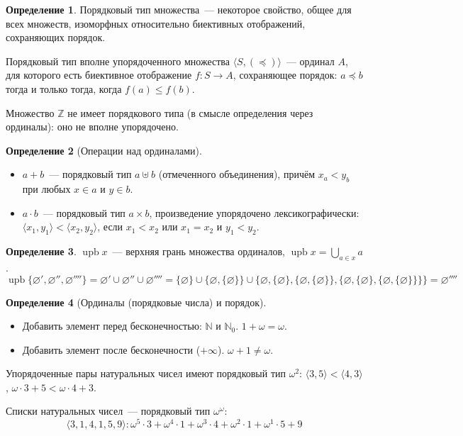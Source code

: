 \documentclass[a4paper,11pt]{article}
\theoremstyle{definition}
\newtheorem*{dfn}{Определение}
\newcommand{\upb}{\operatorname{upb}}
\begin{document}
\begin{dfn}
Порядковый тип множества~--- некоторое свойство, общее для всех множеств,
изоморфных относительно биективных отображений, сохраняющих порядок.

Порядковый тип вполне упорядоченного множества $\langle S, (\preceq)\rangle$~---
ординал $A$, для которого есть биективное отображение $f : S \to A$,
сохраняющее порядок: $a \preceq b$ тогда и только тогда, когда $f(a) \le f(b)$.

Множество $\mathbb{Z}$ не имеет порядкового типа (в смысле определения через
ординалы): оно не вполне упорядочено.
\end{dfn}
\begin{dfn}[Операции над ординалами]
\begin{itemize}
\item $a + b$~--- порядковый тип $a \uplus b$ (отмеченного объединения), причём
  $x_a < y_b$ при любых $x \in a$ и $y \in b$.
\item $a \cdot b$~--- порядковый тип $a \times b$, произведение упорядочено
  лексикографически: $\langle x_1, y_1\rangle < \langle x_2, y_2\rangle$, если
  $x_1 < x_2$ или $x_1 = x_2$ и $y_1 < y_2$.
\end{itemize}
\end{dfn}
\begin{dfn}
$\upb x$~--- верхняя грань множества ординалов, $\upb x = \bigcup_{a \in x} a$.
\[
\upb\{\varnothing', \varnothing'', \varnothing''''\} = \varnothing' \cup \varnothing'' \cup \varnothing'''' = \{\varnothing\} \cup \{\varnothing, \{\varnothing\}\} \cup \{\varnothing, \{\varnothing\}, \{\varnothing, \{\varnothing\}\}, \{\varnothing, \{\varnothing\}, \{\varnothing, \{\varnothing\}\}\}\} = \varnothing''''
\]
\end{dfn}
\begin{dfn}[Ординалы (порядковые числа) и порядок]
\begin{itemize}
\item Добавить элемент перед бесконечностью: $\mathbb{N}$ и $\mathbb{N}_0$.
  $1 + \omega = \omega$.
\item Добавить элемент после бесконечности ($+\infty$). $\omega + 1 \ne \omega$.
\end{itemize}
Упорядоченные пары натуральных чисел имеют порядковый тип $\omega^2$:
$\langle 3, 5\rangle < \langle 4, 3\rangle$, $\omega \cdot 3 + 5 < \omega \cdot
4 + 3$.

Списки натуральных чисел~--- порядковый тип $\omega^\omega$:
\[ \langle 3, 1, 4, 1, 5, 9\rangle : \omega^5 \cdot 3 + \omega^4 \cdot 1 + \omega^3 \cdot 4 + \omega^2 \cdot 1 + \omega^1 \cdot 5 + 9 \]
\end{dfn}
\end{document}
